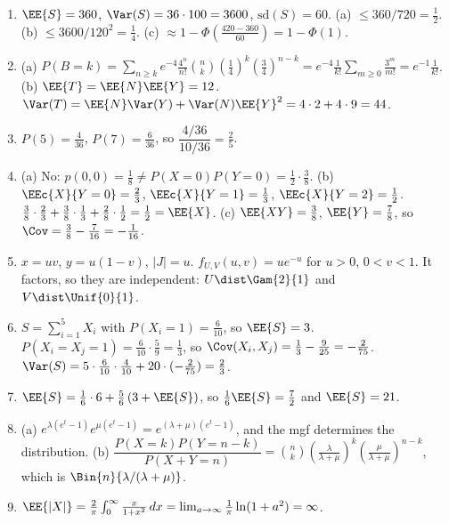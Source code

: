 \documentclass[11pt]{article}
\begin{document}
\begin{enumerate}
  \item[\textbf{5.}]
    $\EE{S} = 360$, $\Var(S) = 36\cdot 100 = 3600$, $\mathrm{sd}(S) = 60$.
    (a) $\le 360/720 = \tfrac12$. (b) $\le 3600/120^2 = \tfrac14$.
    (c) $\approx 1 - \Phi\!\left(\tfrac{420-360}{60}\right) = 1 - \Phi(1)$.

  \item[\textbf{6.}]
    (a) $P(B=k) = \sum_{n\ge k} e^{-4}\tfrac{4^n}{n!}\binom{n}{k}(\tfrac14)^k(\tfrac34)^{n-k}
    = e^{-4}\tfrac{1}{k!}\sum_{m\ge0}\tfrac{3^m}{m!} = e^{-1}\tfrac{1}{k!}$.
    (b) $\EE{T} = \EE{N}\EE{Y} = 12$.
    $\Var(T) = \EE{N}\Var(Y) + \Var(N)\EE{Y}^2 = 4\cdot2 + 4\cdot9 = 44$.

  \item[\textbf{7.}]
    $P(5) = \tfrac{4}{36}$, $P(7) = \tfrac{6}{36}$, so $\dfrac{4/36}{10/36} = \tfrac25$.

  \item[\textbf{8.}]
    (a) No: $p(0,0) = \tfrac18 \ne P(X=0)P(Y=0) = \tfrac12\cdot\tfrac38$.
    (b) $\EEc{X}{Y=0} = \tfrac23$, $\EEc{X}{Y=1} = \tfrac13$, $\EEc{X}{Y=2} = \tfrac12$.
    $\tfrac38\cdot\tfrac23 + \tfrac38\cdot\tfrac13 + \tfrac28\cdot\tfrac12 = \tfrac12 = \EE{X}$.
    (c) $\EE{XY} = \tfrac38$, $\EE{Y} = \tfrac78$, so $\Cov = \tfrac38 - \tfrac{7}{16} = -\tfrac{1}{16}$.

  \item[\textbf{9.}]
    $x = uv$, $y = u(1-v)$, $|J| = u$. $f_{U,V}(u,v) = u e^{-u}$ for $u>0$,
    $0<v<1$. It factors, so they are independent:
    $U \dist \Gam{2}{1}$ and $V \dist \Unif{0}{1}$.

  \item[\textbf{10.}]
    $S = \sum_{i=1}^5 X_i$ with $P(X_i = 1) = \tfrac{6}{10}$, so $\EE{S} = 3$.
    $P(X_i = X_j = 1) = \tfrac{6}{10}\cdot\tfrac59 = \tfrac13$, so
    $\Cov(X_i,X_j) = \tfrac13 - \tfrac{9}{25} = -\tfrac{2}{75}$.
    $\Var(S) = 5\cdot\tfrac{6}{10}\cdot\tfrac{4}{10} + 20\cdot(-\tfrac{2}{75}) = \tfrac23$.

  \item[\textbf{11.}]
    $\EE{S} = \tfrac16\cdot 6 + \tfrac56\left(3 + \EE{S}\right)$, so
    $\tfrac16\EE{S} = \tfrac72$ and $\EE{S} = 21$.

  \item[\textbf{12.}]
    (a) $e^{\lambda(e^t-1)}e^{\mu(e^t-1)} = e^{(\lambda+\mu)(e^t-1)}$, and the mgf
    determines the distribution.
    (b) $\dfrac{P(X=k)P(Y=n-k)}{P(X+Y=n)} = \binom{n}{k}\left(\tfrac{\lambda}{\lambda+\mu}\right)^k
    \left(\tfrac{\mu}{\lambda+\mu}\right)^{n-k}$, which is $\Bin{n}{\lambda/(\lambda+\mu)}$.

  \item[\textbf{13.}]
    $\EE{|X|} = \tfrac{2}{\pi}\int_0^\infty \tfrac{x}{1+x^2}\,dx
    = \lim_{a\to\infty}\tfrac1\pi\ln(1+a^2) = \infty$.
\end{enumerate}
\end{document}
